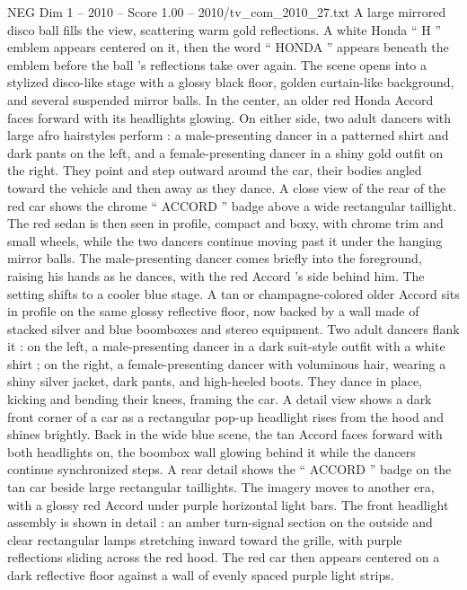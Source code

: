 \begin{textsample}{NEG Dim 1 – 2010 – Score 1.00 – 2010/tv\_com\_2010\_27.txt}  \label{ex:f1_neg_077}
A large mirrored disco ball fills the view, scattering warm gold reflections.
A white Honda “ H ” emblem appears centered on it, then the word “ HONDA ” appears beneath the emblem before the ball ’s reflections take over again.
The scene opens into a stylized disco-like stage with a glossy black floor, golden curtain-like background, and several suspended mirror balls.
In the center, an older red Honda Accord faces forward with its headlights glowing.
On either side, two adult dancers with large afro hairstyles perform : a male-presenting dancer in a patterned shirt and dark pants on the left, and a female-presenting dancer in a shiny gold outfit on the right.
They point and step outward around the car, their bodies angled toward the vehicle and then away as they dance.
A close view of the rear of the red car shows the chrome “ ACCORD ” badge above a wide rectangular taillight.
The red sedan is then seen in profile, compact and boxy, with chrome trim and small wheels, while the two dancers continue moving past it under the hanging mirror balls.
The male-presenting dancer comes briefly into the foreground, raising his hands as he dances, with the red Accord ’s side behind him.
The setting shifts to a cooler blue stage.
A tan or champagne-colored older Accord sits in profile on the same glossy reflective floor, now backed by a wall made of stacked silver and blue boomboxes and stereo equipment.
Two adult dancers flank it : on the left, a male-presenting dancer in a dark suit-style outfit with a white shirt ; on the right, a female-presenting dancer with voluminous hair, wearing a shiny silver jacket, dark pants, and high-heeled boots.
They dance in place, kicking and bending their knees, framing the car.
A detail view shows a dark front corner of a car as a rectangular pop-up headlight rises from the hood and shines brightly.
Back in the wide blue scene, the tan Accord faces forward with both headlights on, the boombox wall glowing behind it while the dancers continue synchronized steps.
A rear detail shows the “ ACCORD ” badge on the tan car beside large rectangular taillights.
The imagery moves to another era, with a glossy red Accord under purple horizontal light bars.
The front headlight assembly is shown in detail : an amber turn-signal section on the outside and clear rectangular lamps stretching inward toward the grille, with purple reflections sliding across the red hood.
The red car then appears centered on a dark reflective floor against a wall of evenly spaced purple light strips.

\end{textsample}
